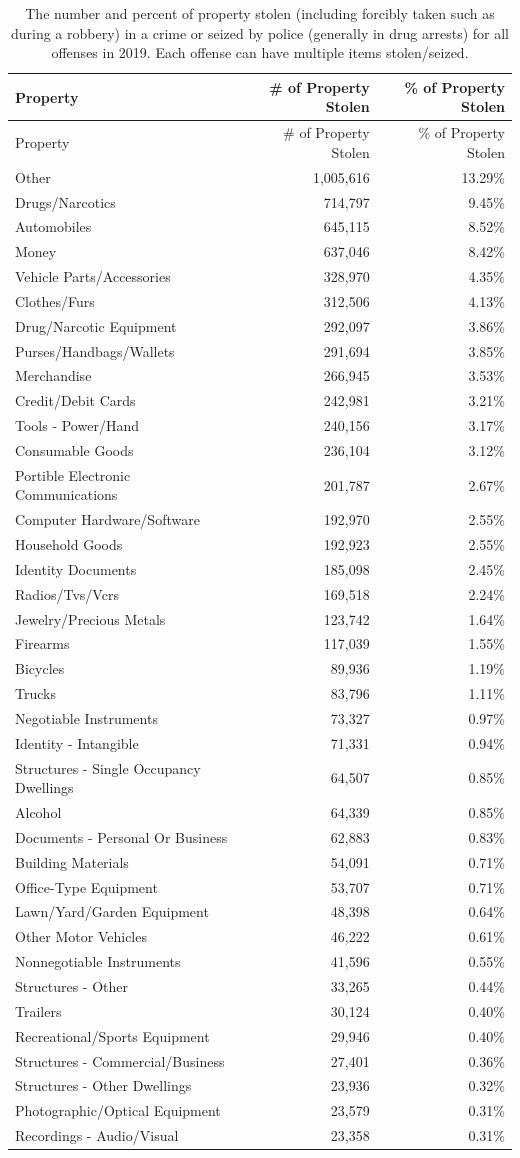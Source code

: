 \documentclass[
  12pt,
  openany]{book}
\begin{document}
\begin{longtable}[]{@{}lrr@{}}
\caption{\label{tab:propertyDescription}The number and percent of property stolen (including forcibly taken such as during a robbery) in a crime or seized by police (generally in drug arrests) for all offenses in 2019. Each offense can have multiple items stolen/seized.}\tabularnewline
\toprule
Property & \# of Property Stolen & \% of Property Stolen\tabularnewline
\midrule
\endfirsthead
\toprule
Property & \# of Property Stolen & \% of Property Stolen\tabularnewline
\midrule
\endhead
Other & 1,005,616 & 13.29\%\tabularnewline
Drugs/Narcotics & 714,797 & 9.45\%\tabularnewline
Automobiles & 645,115 & 8.52\%\tabularnewline
Money & 637,046 & 8.42\%\tabularnewline
Vehicle Parts/Accessories & 328,970 & 4.35\%\tabularnewline
Clothes/Furs & 312,506 & 4.13\%\tabularnewline
Drug/Narcotic Equipment & 292,097 & 3.86\%\tabularnewline
Purses/Handbags/Wallets & 291,694 & 3.85\%\tabularnewline
Merchandise & 266,945 & 3.53\%\tabularnewline
Credit/Debit Cards & 242,981 & 3.21\%\tabularnewline
Tools - Power/Hand & 240,156 & 3.17\%\tabularnewline
Consumable Goods & 236,104 & 3.12\%\tabularnewline
Portible Electronic Communications & 201,787 & 2.67\%\tabularnewline
Computer Hardware/Software & 192,970 & 2.55\%\tabularnewline
Household Goods & 192,923 & 2.55\%\tabularnewline
Identity Documents & 185,098 & 2.45\%\tabularnewline
Radios/Tvs/Vcrs & 169,518 & 2.24\%\tabularnewline
Jewelry/Precious Metals & 123,742 & 1.64\%\tabularnewline
Firearms & 117,039 & 1.55\%\tabularnewline
Bicycles & 89,936 & 1.19\%\tabularnewline
Trucks & 83,796 & 1.11\%\tabularnewline
Negotiable Instruments & 73,327 & 0.97\%\tabularnewline
Identity - Intangible & 71,331 & 0.94\%\tabularnewline
Structures - Single Occupancy Dwellings & 64,507 & 0.85\%\tabularnewline
Alcohol & 64,339 & 0.85\%\tabularnewline
Documents - Personal Or Business & 62,883 & 0.83\%\tabularnewline
Building Materials & 54,091 & 0.71\%\tabularnewline
Office-Type Equipment & 53,707 & 0.71\%\tabularnewline
Lawn/Yard/Garden Equipment & 48,398 & 0.64\%\tabularnewline
Other Motor Vehicles & 46,222 & 0.61\%\tabularnewline
Nonnegotiable Instruments & 41,596 & 0.55\%\tabularnewline
Structures - Other & 33,265 & 0.44\%\tabularnewline
Trailers & 30,124 & 0.40\%\tabularnewline
Recreational/Sports Equipment & 29,946 & 0.40\%\tabularnewline
Structures - Commercial/Business & 27,401 & 0.36\%\tabularnewline
Structures - Other Dwellings & 23,936 & 0.32\%\tabularnewline
Photographic/Optical Equipment & 23,579 & 0.31\%\tabularnewline
Recordings - Audio/Visual & 23,358 & 0.31\%\tabularnewline

\end{longtable}
\end{document}

